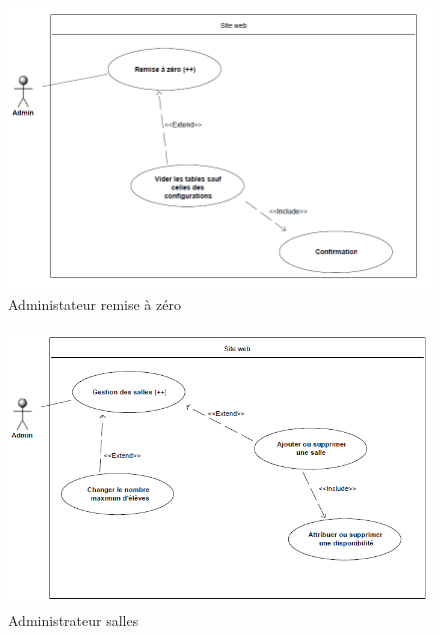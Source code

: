     \begin{figure}[h]
        \begin{center}
            \includegraphics[scale=0.50]{images/uml/adminRAZ.png} 
        \end{center}

        \caption{Administateur remise à zéro}
        \label{Administateur remise à zéro}
    \end{figure}

    \begin{figure}[h]
        \begin{center}
            \includegraphics[scale=0.50]{images/uml/adminSalles.png} 
        \end{center}

        \caption{Administrateur salles}
        \label{Administrateur salles}
    \end{figure}

